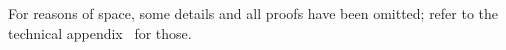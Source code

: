 \documentclass[compsoc,conference,letterpaper,fleqn]{IEEEtran}
\begin{document}
For reasons of space, some details and all proofs have been omitted;
refer to the technical appendix~\cite{technical_appendix} for those.





\end{document}
